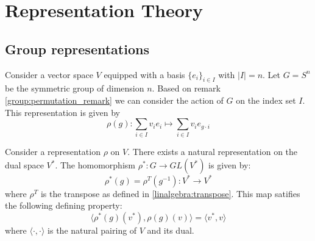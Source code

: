 \chapter{Representation Theory}

\section{Group representations}

        
	\begin{example}
		Consider a vector space $V$ equipped with a basis $\{e_i\}_{i\in I}$ with $|I| = n$. Let $G = S^n$ be the symmetric group of dimension $n$. Based on remark \ref{group:permutation_remark} we can consider the action of $G$ on the index set $I$. This representation is given by
		\begin{equation}
			\rho(g):\sum_{i\in I}v_ie_i\mapsto\sum_{i\in I}v_ie_{g\cdot i}
		\end{equation}
	\end{example}
        
        \begin{example}
        	Consider a representation $\rho$ on $V$. There exists a natural representation on the dual space $V^*$. The homomorphism $\rho^*:G\rightarrow GL(V^*)$ is given by:
            \begin{equation}
            	\rho^*(g) = \rho^T(g^{-1}): V^*\rightarrow V^*
            \end{equation}
            where $\rho^T$ is the transpose as defined in \ref{linalgebra:transpose}. This map satifies the following defining property:
            \begin{equation}
            	\Big\langle\rho^*(g)(v^*), \rho(g)(v)\Big\rangle = \langle v^*, v\rangle
            \end{equation}
            where $\langle\cdot,\cdot\rangle$ is the natural pairing of $V$ and its dual.
        \end{example}
        
